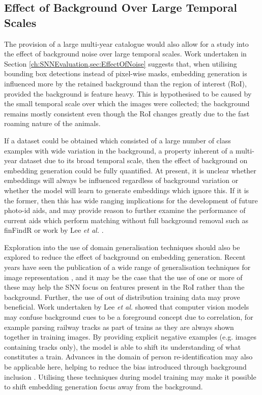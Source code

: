 \subsection{Effect of Background Over Large Temporal Scales}\label{ch:Conclusion,sec:FutureWork,sub:EffectOfBackgroundOnLargeTemporalScales}

The provision of a large multi-year catalogue would also allow for a study into the effect of background noise over large temporal scales. Work undertaken in Section \ref{ch:SNNEvaluation,sec:EffectOfNoise} suggests that, when utilising bounding box detections instead of pixel-wise masks, embedding generation is influenced more by the retained background than the region of interest (RoI), provided the background is feature heavy. This is hypothesised to be caused by the small temporal scale over which the images were collected; the background remains mostly consistent even though the RoI changes greatly due to the fast roaming nature of the animals. 

If a dataset could be obtained which consisted of a large number of class examples with wide variation in the background, a property inherent of a multi-year dataset due to its broad temporal scale, then the effect of background on embedding generation could be fully quantified. At present, it is unclear whether embeddings will always be influenced regardless of background variation or whether the model will learn to generate embeddings which ignore this. If it is the former, then this has wide ranging implications for the development of future photo-id aids, and may provide reason to further examine the performance of current aids which perform matching without full background removal such as finFindR \cite{thompson_finfindr_2022} or work by Lee \textit{et al.} \cite{lee_backbone_2020}. 

Exploration into the use of domain generalisation techniques should also be explored to reduce the effect of background on embedding generation. Recent years have seen the publication of a wide range of generalisation techniques for image representation \cite{zheng_exploiting_2019, yan_clusterfit_2020, creager_environment_2021, zhou_domain_2022, tommasi_domain_2015, cohn_improving_1994, neyshabur_exploring_2017}, and it may be the case that the use of one or more of these may help the SNN focus on features present in the RoI rather than the background. Further, the use of out of distribution training data may prove beneficial. Work undertaken by Lee \textit{et al.} \cite{lee_weakly_2022} showed that computer vision models may confuse background cues to be a foreground concept due to correlation, for example parsing railway tracks as part of trains as they are always shown together in training images. By providing explicit negative examples (e.g. images containing tracks only), the model is able to shift its understanding of what constitutes a train. Advances in the domain of person re-identification may also be applicable here, helping to reduce the bias introduced through background inclusion \cite{nguyen_background_2016, huang_sbsgan_2019, tian_eliminating_2018}. Utilising these techniques during model training may make it possible to shift embedding generation focus away from the background. 

